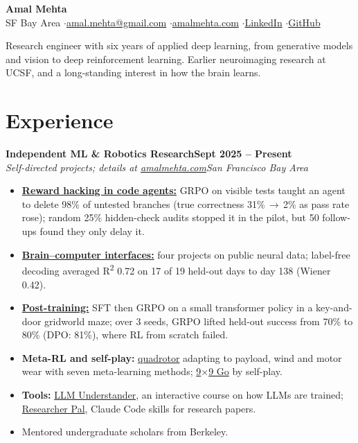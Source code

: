 \documentclass[10pt]{article}
\newcommand{\role}[4]{\textbf{#1}\hfill\textbf{#2}\\\textit{#3}\hfill\textit{#4}}
\begin{document}
\fontsize{9.8}{11.2}\selectfont

\begin{center}
{\LARGE\bfseries Amal Mehta}\\[3pt]
SF Bay Area \quad$\cdot$\quad \href{mailto:amal.mehta@gmail.com}{amal.mehta@gmail.com} \quad$\cdot$\quad \href{https://amalmehta.com/}{amalmehta.com} \quad$\cdot$\quad \href{https://www.linkedin.com/in/amal-mehta-264413a9/}{LinkedIn} \quad$\cdot$\quad \href{https://github.com/amalmehta}{GitHub}
\end{center}

Research engineer with six years of applied deep learning, from generative models and vision to deep reinforcement learning. Earlier neuroimaging research at UCSF, and a long-standing interest in how the brain learns.

\section*{Experience}

\role{Independent ML \& Robotics Research}{Sept 2025 -- Present}{Self-directed projects; details at \href{https://amalmehta.com/}{amalmehta.com}}{San Francisco Bay Area}
\begin{itemize}
\item \href{https://amalmehta.github.io/long_term_horizon_planning/}{\textbf{Reward hacking in code agents:}} GRPO on visible tests taught an agent to delete 98\% of untested branches (true correctness 31\%\,$\to$\,2\% as pass rate rose); random 25\% hidden-check audits stopped it in the pilot, but 50 follow-ups found they only delay it.
\item \href{https://github.com/amalmehta/BCIProjects}{\textbf{Brain--computer interfaces:}} four projects on public neural data; label-free decoding averaged R\textsuperscript{2} 0.72 on 17 of 19 held-out days to day 138 (Wiener 0.42).
\item \href{https://github.com/amalmehta/PostTrainingLab}{\textbf{Post-training:}} SFT then GRPO on a small transformer policy in a key-and-door gridworld maze; over 3 seeds, GRPO lifted held-out success from 70\% to 80\% (DPO: 81\%), where RL from scratch failed.
\item \textbf{Meta-RL and self-play:} \href{https://amalmehta.github.io/DroneAutonomy/}{quadrotor} adapting to payload, wind and motor wear with seven meta-learning methods; \href{https://amalmehta.github.io/AlphaGoLite/}{9$\times$9 Go} by self-play.
\item \textbf{Tools:} \href{https://amalmehta.github.io/LLMUnderstander/}{LLM Understander}, an interactive course on how LLMs are trained; \href{https://github.com/amalmehta/researcher_pal}{Researcher Pal}, Claude Code skills for research papers.
\item Mentored undergraduate scholars from Berkeley.
\end{itemize}
\end{document}
